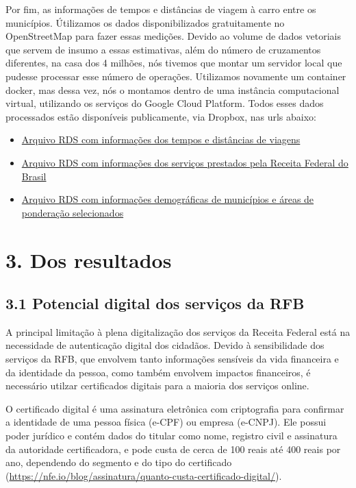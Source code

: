 \documentclass[]{article}
\providecommand{\tightlist}{%
  \setlength{\itemsep}{0pt}\setlength{\parskip}{0pt}}
\begin{document}
Por fim, as informações de tempos e distâncias de viagem à carro entre
os municípios. Útilizamos os dados disponibilizados gratuitamente no
OpenStreetMap para fazer essas medições. Devido ao volume de dados
vetoriais que servem de insumo a essas estimativas, além do número de
cruzamentos diferentes, na casa dos 4 milhões, nós tivemos que montar um
servidor local que pudesse processar esse número de operações.
Utilizamos novamente um container docker, mas dessa vez, nós o montamos
dentro de uma instância computacional virtual, utilizando os serviços do
Google Cloud Platform. Todos esses dados processados estão disponíveis
publicamente, via Dropbox, nas urls abaixo:

\begin{itemize}
\tightlist
\item
  \href{https://www.dropbox.com/s/jkiiwwxz73eys9e/01_viagens.rds?raw=1}{Arquivo
  RDS com informações dos tempos e distâncias de viagens}
\item
  \href{https://www.dropbox.com/s/84hrt2ntrx9k0t0/02_servi\%C3\%A7os.rds?raw=1}{Arquivo
  RDS com informações dos serviços prestados pela Receita Federal do
  Brasil}
\item
  \href{https://www.dropbox.com/s/stsxm0cl98lmnzg/03_demografia.rds?raw=1}{Arquivo
  RDS com informações demográficas de municípios e áreas de ponderação
  selecionados}
\end{itemize}

\hypertarget{dos-resultados}{%
\section{3. Dos resultados}\label{dos-resultados}}

\hypertarget{potencial-digital-dos-servicos-da-rfb}{%
\subsection{3.1 Potencial digital dos serviços da
RFB}\label{potencial-digital-dos-servicos-da-rfb}}

A principal limitação à plena digitalização dos serviços da Receita
Federal está na necessidade de autenticação digital dos cidadãos. Devido
à sensibilidade dos serviços da RFB, que envolvem tanto informações
sensíveis da vida financeira e da identidade da pessoa, como também
envolvem impactos financeiros, é necessário utilzar certificados
digitais para a maioria dos serviços online.

O certificado digital é uma assinatura eletrônica com criptografia para
confirmar a identidade de uma pessoa física (e-CPF) ou empresa (e-CNPJ).
Ele possui poder jurídico e contém dados do titular como nome, registro
civil e assinatura da autoridade certificadora, e pode custa de cerca de
100 reais até 400 reais por ano, dependendo do segmento e do tipo do
certificado
(\url{https://nfe.io/blog/assinatura/quanto-custa-certificado-digital/}).
\end{document}
